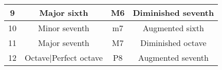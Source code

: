 \documentclass[pstricks]{amsart}
\begin{document}
\begin{table}[h]
\begin{tabular}{|c|c|c|c|}
    9                                                             & Major sixth                    & M6                & Diminished seventh             \\ \hline
    10                                                            & Minor seventh                  & m7                & Augmented sixth                \\ \hline
    11                                                            & Major seventh                  & M7                & Diminished octave              \\ \hline
    12                                                            & Octave|Perfect octave          & P8                & Augmented seventh              \\ \hline
  \end{tabular}
\end{table}
\end{document}
